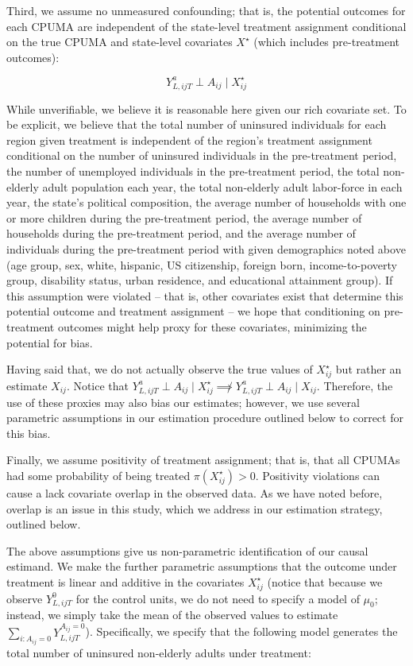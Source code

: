 \documentclass[12pt]{article}
\begin{document}
Third, we assume no unmeasured confounding; that is, the potential outcomes for each CPUMA are independent of the state-level treatment assignment conditional on the true CPUMA and state-level covariates $X^\star$ (which includes pre-treatment outcomes):

$$
Y_{L, ijT}^a \perp A_{ij} \mid X_{ij}^\star
$$

While unverifiable, we believe it is reasonable here given our rich covariate set. To be explicit, we believe that the total number of uninsured individuals for each region given treatment is independent of the region's treatment assignment conditional on the number of uninsured individuals in the pre-treatment period, the number of unemployed individuals in the pre-treatment period, the total non-elderly adult population each year, the total non-elderly adult labor-force in each year, the state's political composition, the average number of households with one or more children during the pre-treatment period, the average number of households during the pre-treatment period, and the average number of individuals during the pre-treatment period with given demographics noted above (age group, sex, white, hispanic, US citizenship, foreign born, income-to-poverty group, disability status, urban residence, and educational attainment group). If this assumption were violated -- that is, other covariates exist that determine this potential outcome and treatment assignment -- we hope that conditioning on pre-treatment outcomes might help proxy for these covariates, minimizing the potential for bias. 

Having said that, we do not actually observe the true values of $X^\star_{ij}$ but rather an estimate $X_{ij}$. Notice that $Y_{L, ijT}^a \perp A_{ij} \mid X^\star_{ij} \not\implies Y_{L, ijT}^a \perp A_{ij} \mid X_{ij}$. Therefore, the use of these proxies may also bias our estimates; however, we use several parametric assumptions in our estimation procedure outlined below to correct for this bias.

Finally, we assume positivity of treatment assignment; that is, that all CPUMAs had some probability of being treated $\pi(X^\star_{ij}) > 0$. Positivity violations can cause a lack covariate overlap in the observed data. As we have noted before, overlap is an issue in this study, which we address in our estimation strategy, outlined below.

The above assumptions give us non-parametric identification of our causal estimand. We make the further parametric assumptions that the outcome under treatment is linear and additive in the covariates $X^\star_{ij}$ (notice that because we observe $Y_{L, ijT}^0$ for the control units, we do not need to specify a model of $\mu_0$; instead, we simply take the mean of the observed values to estimate $\sum_{i: A_{ij} = 0} Y_{L, ijT}^{A_{ij} = 0}$). Specifically, we specify that the following model generates the total number of uninsured non-elderly adults under treatment:
\end{document}
